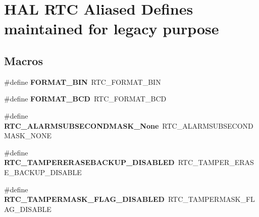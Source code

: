 \hypertarget{group___h_a_l___r_t_c___aliased___defines}{}\section{H\+AL R\+TC Aliased Defines maintained for legacy purpose}
\label{group___h_a_l___r_t_c___aliased___defines}
\subsection*{Macros}
\begin{DoxyCompactItemize}
\item 
\mbox{\label{group___h_a_l___r_t_c___aliased___defines_ga1adf0882a1368a3cef0edc34dcf8d34e}} 
\#define {\bfseries F\+O\+R\+M\+A\+T\+\_\+\+B\+IN}~R\+T\+C\+\_\+\+F\+O\+R\+M\+A\+T\+\_\+\+B\+IN
\item 
\mbox{\label{group___h_a_l___r_t_c___aliased___defines_ga950fc88b539cc9a8cf66aab2ee860fe1}} 
\#define {\bfseries F\+O\+R\+M\+A\+T\+\_\+\+B\+CD}~R\+T\+C\+\_\+\+F\+O\+R\+M\+A\+T\+\_\+\+B\+CD
\item 
\mbox{\label{group___h_a_l___r_t_c___aliased___defines_ga242adf20d2422fd1ae7715b8acd82623}} 
\#define {\bfseries R\+T\+C\+\_\+\+A\+L\+A\+R\+M\+S\+U\+B\+S\+E\+C\+O\+N\+D\+M\+A\+S\+K\+\_\+\+None}~R\+T\+C\+\_\+\+A\+L\+A\+R\+M\+S\+U\+B\+S\+E\+C\+O\+N\+D\+M\+A\+S\+K\+\_\+\+N\+O\+NE
\item 
\mbox{\label{group___h_a_l___r_t_c___aliased___defines_ga55d9466b1ec35bce5df17af28e142014}} 
\#define {\bfseries R\+T\+C\+\_\+\+T\+A\+M\+P\+E\+R\+E\+R\+A\+S\+E\+B\+A\+C\+K\+U\+P\+\_\+\+D\+I\+S\+A\+B\+L\+ED}~R\+T\+C\+\_\+\+T\+A\+M\+P\+E\+R\+\_\+\+E\+R\+A\+S\+E\+\_\+\+B\+A\+C\+K\+U\+P\+\_\+\+D\+I\+S\+A\+B\+LE
\item 
\mbox{\label{group___h_a_l___r_t_c___aliased___defines_gad032982f8c14ffd4864df3ebfee45f70}} 
\#define {\bfseries R\+T\+C\+\_\+\+T\+A\+M\+P\+E\+R\+M\+A\+S\+K\+\_\+\+F\+L\+A\+G\+\_\+\+D\+I\+S\+A\+B\+L\+ED}~R\+T\+C\+\_\+\+T\+A\+M\+P\+E\+R\+M\+A\+S\+K\+\_\+\+F\+L\+A\+G\+\_\+\+D\+I\+S\+A\+B\+LE

\end{DoxyCompactItemize}
